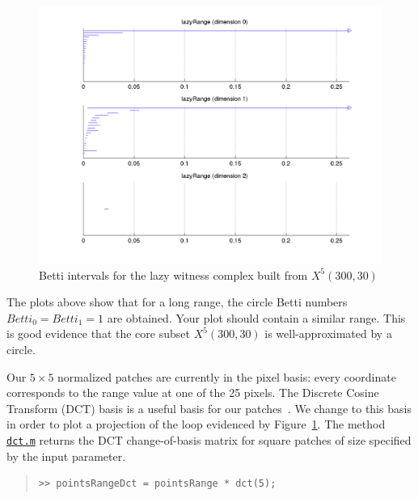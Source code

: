 \documentclass[amscd, amssymb, verbatim]{amsart}[12pt]
\theoremstyle{remark}
\theoremstyle{remark}
\theoremstyle{remark}
\begin{document}
\begin{figure}[htp]
	\begin{center}
    	\includegraphics[width=6in]{lazyRange.png}
   	\end{center}
	\caption{Betti intervals for the lazy witness complex built from $X^5(300,30)$}
  	\label{fig:rangeBetti}
\end{figure}
\FloatBarrier

The plots above show that for a long range, the circle Betti numbers $Betti_0 = Betti_1 = 1$ are obtained. Your plot should contain a similar range. This is good evidence that the core subset $X^5(300,30)$ is well-approximated by a circle. 

Our $5\times 5$ normalized patches are currently in the pixel basis: every coordinate corresponds to the range value at one of the 25 pixels. The Discrete Cosine Transform (DCT) basis is a useful basis for our patches~\citep{Range, Mumford}. We change to this basis in order to plot a projection of the loop evidenced by Figure~\ref{fig:rangeBetti}. The method \href{https://github.com/appliedtopology/javaplex/tree/master/src/matlab/for_distribution/tutorial_examples/dct.m}{\texttt{dct.m}} returns the DCT change-of-basis matrix for square patches of size specified by the input parameter.

\begin{quote} \begin{verbatim} 
>> pointsRangeDct = pointsRange * dct(5);
\end{verbatim} \end{quote}
\end{document}
